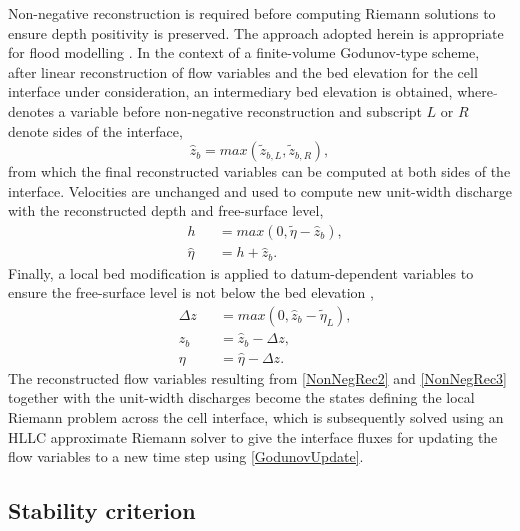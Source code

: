 Non-negative reconstruction is required before computing Riemann solutions to ensure depth positivity is preserved. The approach adopted herein is appropriate for flood modelling \citep{Liang2010a}. In the context of a finite-volume Godunov-type scheme, after linear reconstruction of flow variables and the bed elevation for the cell interface under consideration, an intermediary bed elevation is obtained, where \(\tilde{ }\) denotes a variable before non-negative reconstruction and subscript \(L\) or \(R\) denote sides of the interface,
\begin{equation}
	\label{NonNegRec1}
	\hat{z}_b = max(\tilde{z}_{b,L}, \tilde{z}_{b,R}) ,
\end{equation}
from which the final reconstructed variables can be computed at both sides of the interface. Velocities are unchanged and used to compute new unit-width discharge with the reconstructed depth and free-surface level,
\begin{equation}
	\label{NonNegRec2}
	\begin{alignedat}{2}
		&h && = max(0, \tilde{\eta} - \hat{z}_b) ,\\
		&\hat{\eta} && = h + \hat{z}_b .
	\end{alignedat}
\end{equation}
Finally, a local bed modification is applied to datum-dependent variables to ensure the free-surface level is not below the bed elevation \citep{Liang2010},
\begin{equation}
	\label{NonNegRec3}
	\begin{alignedat}{2}
		&\Delta z && = max(0, \hat{z}_b - \tilde{\eta}_L) ,\\
		&z_b      && = \hat{z}_b - \Delta z               ,\\
		&\eta     && = \hat{\eta} - \Delta z              .
	\end{alignedat}
\end{equation}
The reconstructed flow variables resulting from \eqref{NonNegRec2} and \eqref{NonNegRec3} together with the unit-width discharges become the states defining the local Riemann problem across the cell interface, which is subsequently solved using an HLLC approximate Riemann solver to give the interface fluxes for updating the flow variables to a new time step using \eqref{GodunovUpdate}.

\subsection{Stability criterion}

